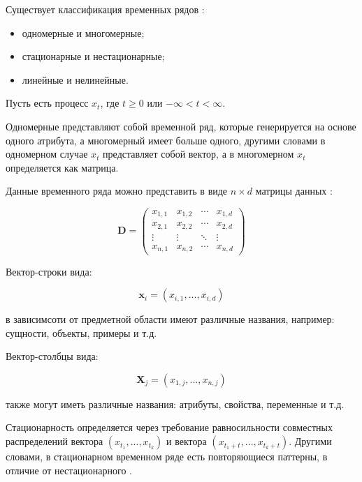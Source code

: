 Существует классификация временных рядов  \cite{zhang-series} :

\begin{itemize}
    \item одномерные и многомерные;
    \item стационарные и нестационарные;
    \item линейные и нелинейные.
\end{itemize}

Пусть есть процесс $x_t$, где $t \geq 0$ или $-\infty < t < \infty $.

Одномерные представляют собой временной ряд, которые генерируется на основе одного атрибута,
а многомерный имеет больше одного, другими словами в одномерном случае $x_t$ представляет собой вектор,
а в многомерном $x_t$ определяется как матрица.

Данные временного ряда можно представить в виде $n\times d$ матрицы данных \cite{zaki}: 

\begin{equation} \label{data_matrix}
    \textbf{D} = 
    \begin{pmatrix}
    x_{1,1} & x_{1,2} & \cdots & x_{1,d} \\
    x_{2,1} & x_{2,2} & \cdots & x_{2,d} \\
    \vdots  & \vdots  & \ddots & \vdots  \\
    x_{n,1} & x_{n,2} & \cdots & x_{n,d} 
    \end{pmatrix}
\end{equation}

Вектор-строки вида:

\begin{equation}
    \textbf{x}_i = (x_{i,1}, ..., x_{i,d})
\end{equation}

\noindent в зависимсоти от предметной области имеют различные названия, например:
сущности, объекты, примеры и т.д.

Вектор-столбцы вида:

\begin{equation}
    \textbf{X}_j = (x_{1,j}, ..., x_{n,j})
\end{equation}

\noindent также могут иметь различные названия: атрибуты, свойства, переменные и т.д.

Стационарность определяется через требование равносильности совместных распределений вектора
$(x_{t_1}, ..., x_{t_k})$ и вектора $(x_{t_1+t}, ..., x_{t_k+t})$.
Другими словами, в стационарном временном ряде есть повторяющиеся паттерны,
в отличие от нестационарного \cite{terence-series} .

